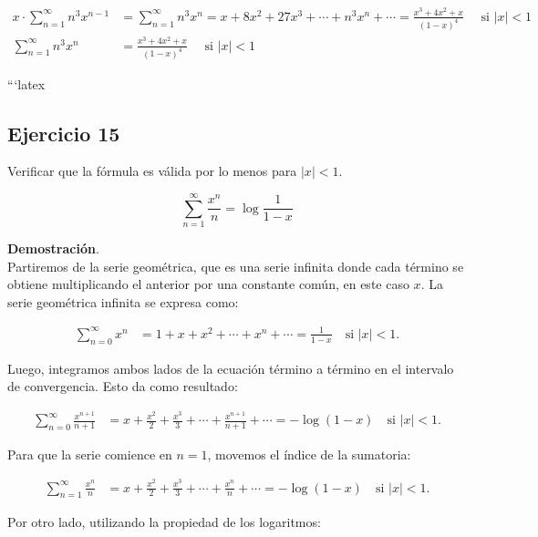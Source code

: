 \documentclass{article}
\begin{document}
    \begin{align*}
        x \cdot \sum_{n=1}^{\infty} n^3 x^{n-1} &= \sum_{n=1}^{\infty} n^3 x^{n} = x + 8x^2 + 27x^3 + \cdots + n^3 x^n + \cdots = \frac{x^3 + 4x^2 + x}{(1-x)^4} \quad \text{ si } |x| < 1 \\
        \sum_{n=1}^{\infty} n^3 x^{n} &= \frac{x^3 + 4x^2 + x}{(1-x)^4} \quad \text{ si } |x| < 1
    \end{align*}

    ```latex
    \subsection*{Ejercicio 15}

    Verificar que la fórmula es válida por lo menos para $|x|<1$.

    $$
    \sum_{n=1}^{\infty} \frac{x^{n}}{n} = \log \frac{1}{1-x}
    $$

    \textbf{Demostración}.\\

    Partiremos de la serie geométrica, que es una serie infinita donde cada término se obtiene multiplicando el anterior por una constante común, en este caso $x$. La serie geométrica infinita se expresa como:

    \begin{align*}
    \sum_{n=0}^{\infty} x^{n} &= 1 + x + x^{2} + \cdots + x^{n} + \cdots = \frac{1}{1-x} \quad \text{si } |x| < 1.
    \end{align*}

    Luego, integramos ambos lados de la ecuación término a término en el intervalo de convergencia. Esto da como resultado:

    \begin{align*}
    \sum_{n=0}^{\infty} \frac{x^{n+1}}{n+1} &= x + \frac{x^{2}}{2} + \frac{x^{3}}{3} + \cdots + \frac{x^{n+1}}{n+1} + \cdots = -\log (1-x) \quad \text{si } |x| < 1.
    \end{align*}

    Para que la serie comience en $n=1$, movemos el índice de la sumatoria:

    \begin{align*}
    \sum_{n=1}^{\infty} \frac{x^{n}}{n} &= x + \frac{x^{2}}{2} + \frac{x^{3}}{3} + \cdots + \frac{x^{n}}{n} + \cdots = -\log (1-x) \quad \text{si } |x| < 1.
    \end{align*}

    Por otro lado, utilizando la propiedad de los logaritmos:
\end{document}
